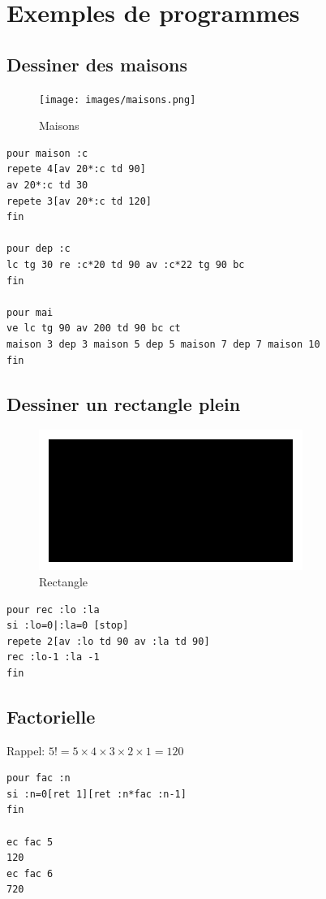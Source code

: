 \chapter{Exemples de programmes}
\section{Dessiner des maisons}

\begin{figure}[h]
\texttt{[image: images/maisons.png]}
\caption{Maisons}
\end{figure}
\begin{verbatim}
pour maison :c
repete 4[av 20*:c td 90]
av 20*:c td 30
repete 3[av 20*:c td 120]
fin

pour dep :c
lc tg 30 re :c*20 td 90 av :c*22 tg 90 bc
fin

pour mai
ve lc tg 90 av 200 td 90 bc ct 
maison 3 dep 3 maison 5 dep 5 maison 7 dep 7 maison 10
fin
\end{verbatim} 
\pagebreak
\section{Dessiner un rectangle plein}
\begin{figure}[h]
\includegraphics*{images/rectangle.png}
\caption{Rectangle}
\end{figure} 

\begin{verbatim}
pour rec :lo :la
si :lo=0|:la=0 [stop]
repete 2[av :lo td 90 av :la td 90]
rec :lo-1 :la -1
fin
\end{verbatim} 
\section{Factorielle}
\label{factorielle}
\noindent Rappel: $5!=5\times4\times3\times2\times1=120$ 
\begin{verbatim}
pour fac :n
si :n=0[ret 1][ret :n*fac :n-1]
fin

ec fac 5
120
ec fac 6
720
\end{verbatim} 

